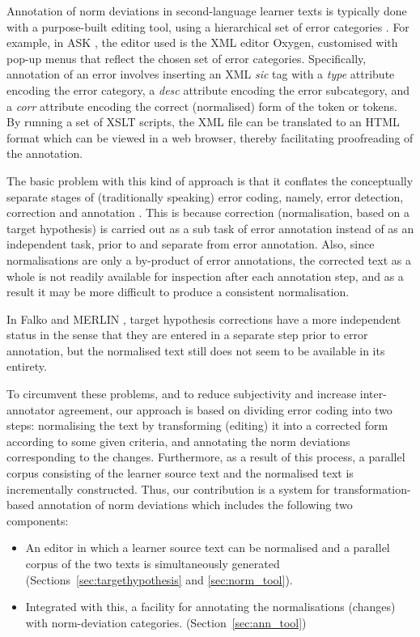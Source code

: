 \documentclass[10pt, a4paper]{article}
\begin{document}
Annotation of norm deviations in second-language learner texts is typically done with a purpose-built editing tool, using a hierarchical set of error categories \cite{Granger2008}. For example, in ASK \cite{tenfjord2006ask}, the editor used is the XML editor Oxygen, customised with pop-up menus that reflect the chosen set of error categories. Specifically, annotation of an error involves inserting an XML
{\em sic} tag with a {\em type} attribute encoding the error category, a {\em desc} attribute encoding the error subcategory, and a {\em corr} attribute encoding the correct (normalised) form of the token or tokens. By running a set of XSLT scripts, the XML file can be translated to an HTML format which can be viewed in a web browser, thereby facilitating proofreading of the annotation.

The basic problem with this kind of approach is that it conflates the conceptually separate stages of (traditionally speaking) error coding, namely, error detection, correction and annotation
\cite[page 266]{Ellis1994,Granger2008}. This is because correction (normalisation, based on a target hypothesis) is carried out as a sub task of error annotation instead of as an independent task, prior to and separate from error annotation. Also, since normalisations are only a by-product of error annotations, the corrected text as a whole is not readily available for inspection after each annotation step, and as a result it may be more difficult to produce a consistent normalisation.

In Falko \cite{ludeling05multi-levelerror} and MERLIN \cite{MERLIN2014}, target hypothesis corrections have a more independent status in the sense that they are entered in a separate step prior to error annotation, but the normalised text still does not seem to be available in its entirety.

To circumvent these problems, and to reduce subjectivity and increase inter-annotator agreement, our approach is based on dividing error coding into two steps: normalising the text by transforming (editing) it into a corrected form according to some given criteria, and annotating the norm deviations corresponding to the changes. Furthermore, as a result of this process, a parallel corpus consisting of the learner source text and the normalised text is incrementally constructed. Thus, our contribution is a system for transformation-based annotation of norm deviations which includes the following two components:

\begin{itemize}
\item An editor in which a learner source text can be normalised and a parallel corpus of the two texts is simultaneously generated (Sections~\ref{sec:targethypothesis} and \ref{sec:norm_tool}).
\item Integrated with this, a facility for annotating the normalisations (changes) with norm-deviation categories. (Section~\ref{sec:ann_tool})
\end{itemize}
\end{document}
